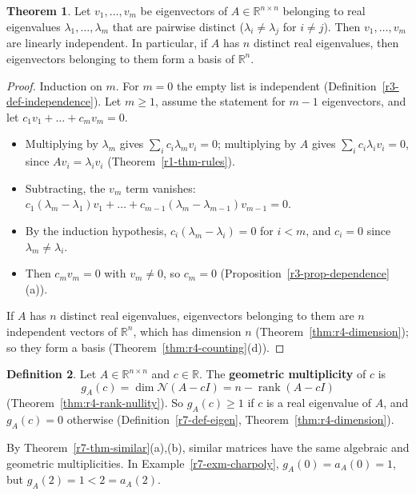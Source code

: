 \documentclass[12pt]{article}
\newcommand{\R}{\mathbb R}
\DeclareMathOperator{\rank}{rank}
\theoremstyle{definition}
\newtheorem{theorem}{Theorem}
\newtheorem{definition}[theorem]{Definition}
\begin{document}
\begin{theorem}\label{r7-thm-indep}
Let \(v_1,\dots,v_m\) be eigenvectors of \(A\in\R^{n\times n}\) belonging to real eigenvalues
\(\lambda_1,\dots,\lambda_m\) that are pairwise distinct (\(\lambda_i\ne\lambda_j\) for \(i\ne j\)). Then
\(v_1,\dots,v_m\) are linearly independent. In particular, if \(A\) has \(n\) distinct real eigenvalues, then
eigenvectors belonging to them form a basis of \(\R^n\).
\end{theorem}
\begin{proof}
Induction on \(m\). For \(m=0\) the empty list is independent (Definition~\ref{r3-def-independence}). Let
\(m\geqslant1\), assume the statement for \(m-1\) eigenvectors, and let \(c_1v_1+\dots+c_mv_m=0\).
\begin{itemize}
\item Multiplying by \(\lambda_m\) gives \(\sum_ic_i\lambda_mv_i=0\); multiplying by \(A\) gives \(\sum_ic_i\lambda_iv_i=0\),
since \(Av_i=\lambda_iv_i\) (Theorem~\ref{r1-thm-rules}).
\item Subtracting, the \(v_m\) term vanishes:
\(c_1(\lambda_m-\lambda_1)v_1+\dots+c_{m-1}(\lambda_m-\lambda_{m-1})v_{m-1}=0\).
\item By the induction hypothesis, \(c_i(\lambda_m-\lambda_i)=0\) for \(i<m\), and \(c_i=0\) since \(\lambda_m\ne\lambda_i\).
\item Then \(c_mv_m=0\) with \(v_m\ne0\), so \(c_m=0\) (Proposition~\ref{r3-prop-dependence}(a)).
\end{itemize}
If \(A\) has \(n\) distinct real eigenvalues, eigenvectors belonging to them are \(n\) independent vectors of \(\R^n\),
which has dimension \(n\) (Theorem~\ref{thm:r4-dimension}); so they form a basis (Theorem~\ref{thm:r4-counting}(d)).
\end{proof}

\begin{definition}\label{r7-def-multiplicity}
Let \(A\in\R^{n\times n}\) and \(c\in\R\). The \textbf{geometric multiplicity} of \(c\) is
\[
g_A(c)=\dim\mathcal N(A-cI)=n-\rank(A-cI)
\]
(Theorem~\ref{thm:r4-rank-nullity}). So \(g_A(c)\geqslant1\) if \(c\) is a real eigenvalue of \(A\), and \(g_A(c)=0\)
otherwise (Definition~\ref{r7-def-eigen}, Theorem~\ref{thm:r4-dimension}).
\end{definition}
By Theorem~\ref{r7-thm-similar}(a),(b), similar matrices have the same algebraic and geometric multiplicities. In
Example~\ref{r7-exm-charpoly}, \(g_A(0)=a_A(0)=1\), but \(g_A(2)=1<2=a_A(2)\).
\end{document}
